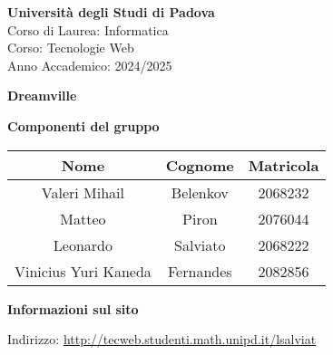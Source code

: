 \begin{minipage}{0.3\textwidth}
    \centering
\end{minipage}
\hfill
\begin{minipage}{0.3\textwidth}
    \centering
\end{minipage}

\bigskip

\begin{center}
    \textbf{Università degli Studi di Padova} \\
    Corso di Laurea: Informatica \\
    Corso: Tecnologie Web \\
    Anno Accademico: 2024/2025
\end{center}

\bigskip
\bigskip
\bigskip

\begin{center}
  \Huge\textbf{Dreamville}
\end{center}

\begin{center}
    \textbf{Componenti del gruppo}
\end{center}

\begin{table}[H]
    \centering
    \begin{tabular}{|c|c|c|}
        \hline
        \cellcolor[HTML]{FFCC00} \textbf{Nome} & \cellcolor[HTML]{FFCC00} \textbf{Cognome} & \cellcolor[HTML]{FFCC00} \textbf{Matricola}  \\ 
        \hline
        Valeri Mihail & Belenkov & 2068232 \\ 
        \hline
        Matteo & Piron & 2076044\\ 
        \hline
        Leonardo & Salviato & 	2068222  \\ 
        \hline
        Vinicius Yuri Kaneda & Fernandes & 	2082856 \\ 
        \hline
    \end{tabular}
\end{table}

\begin{center}
    \textbf{Informazioni sul sito}   

    Indirizzo: \url{http://tecweb.studenti.math.unipd.it/lsalviat} 
\end{center}

